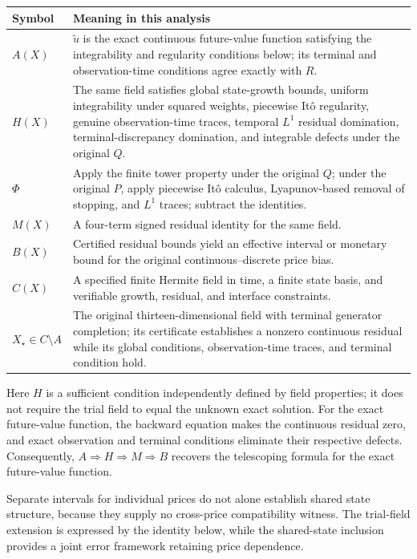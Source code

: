 \documentclass[a4paper,11pt]{article}
\begin{document}
\begingroup\scriptsize\setlength{\tabcolsep}{3pt}
\begin{longtable}{L{0.445000\textwidth}L{0.445000\textwidth}}
Symbol & Meaning in this analysis\\
\hline
$A(X)$ & $\widetilde u$ is the exact continuous future-value function satisfying the integrability and regularity conditions below; its terminal and observation-time conditions agree exactly with $R$.\\
$H(X)$ & The same field satisfies global state-growth bounds, uniform integrability under squared weights, piecewise Itô regularity, genuine observation-time traces, temporal $L^1$ residual domination, terminal-discrepancy domination, and integrable defects under the original $Q$.\\
$\Phi$ & Apply the finite tower property under the original $Q$; under the original $P$, apply piecewise Itô calculus, Lyapunov-based removal of stopping, and $L^1$ traces; subtract the identities.\\
$M(X)$ & A four-term signed residual identity for the same field.\\
$B(X)$ & Certified residual bounds yield an effective interval or monetary bound for the original continuous–discrete price bias.\\
$C(X)$ & A specified finite Hermite field in time, a finite state basis, and verifiable growth, residual, and interface constraints.\\
$X_\star\in C\setminus A$ & The original thirteen-dimensional field with terminal generator completion; its certificate establishes a nonzero continuous residual while its global conditions, observation-time traces, and terminal condition hold.\\
\end{longtable}\endgroup

Here $H$ is a sufficient condition independently defined by field properties; it does not require the trial field to equal the unknown exact solution. For the exact future-value function, the backward equation makes the continuous residual zero, and exact observation and terminal conditions eliminate their respective defects. Consequently, $A\Rightarrow H\Rightarrow M\Rightarrow B$ recovers the telescoping formula for the exact future-value function.

Separate intervals for individual prices do not alone establish shared state structure, because they supply no cross-price compatibility witness. The trial-field extension is expressed by the identity below, while the shared-state inclusion provides a joint error framework retaining price dependence.
\end{document}
